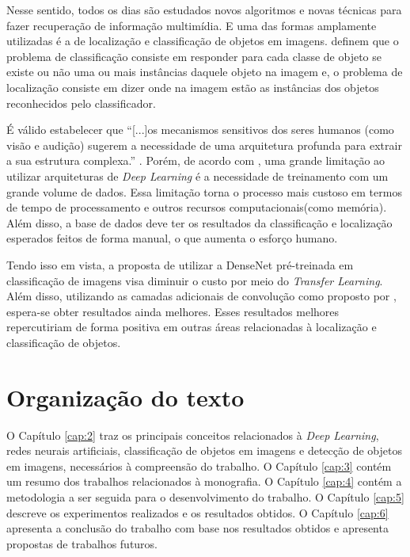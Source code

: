 Nesse sentido, todos os dias são estudados novos algoritmos e novas técnicas para fazer recuperação de informação multimídia. E uma das formas amplamente utilizadas é a de localização e classificação de objetos em imagens.  definem que o problema de classificação consiste em responder para cada classe de objeto se existe ou não uma ou mais instâncias daquele objeto na imagem e, o problema de localização consiste em dizer onde na imagem estão as instâncias dos objetos reconhecidos pelo classificador.

É válido estabelecer que ``[...]os mecanismos sensitivos dos seres humanos (como visão e audição) sugerem a necessidade de uma arquitetura profunda para extrair a sua estrutura complexa.'' \cite{deng-2014}. Porém, de acordo com , uma grande limitação ao utilizar arquiteturas de \textit{Deep Learning} é a necessidade de treinamento com um grande volume de dados. Essa limitação torna o processo mais custoso em termos de tempo de processamento e outros recursos computacionais(como memória). Além disso, a base de dados deve ter os resultados da classificação e localização esperados feitos de forma manual, o que aumenta o esforço humano.

Tendo isso em vista, a proposta de utilizar a \ac{DenseNet} \cite{liu-2017} pré-treinada em classificação de imagens visa diminuir o custo por meio do \textit{Transfer Learning}. Além disso, utilizando as camadas adicionais de convolução como proposto por , espera-se obter resultados ainda melhores. Esses resultados melhores repercutiriam de forma positiva em outras áreas relacionadas à localização e classificação de objetos. 

\section{Organização do texto}
\label{secao:1:4}

O Capítulo \ref{cap:2} traz os principais conceitos relacionados à \textit{Deep Learning}, redes neurais artificiais, classificação de objetos em imagens e detecção de objetos em imagens, necessários à compreensão do trabalho. O Capítulo \ref{cap:3} contém um resumo dos trabalhos relacionados à monografia. O Capítulo \ref{cap:4} contém a metodologia a ser seguida para o desenvolvimento do trabalho. O Capítulo \ref{cap:5} descreve os experimentos realizados e os resultados obtidos. O Capítulo \ref{cap:6} apresenta a conclusão do trabalho com base nos resultados obtidos e apresenta propostas de trabalhos futuros.